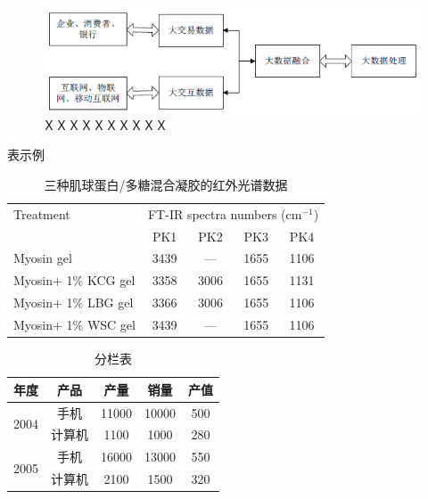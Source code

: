 \documentclass[a4paper]{ltxdoc}
\begin{document}
{\begin{figure}[!htb]
	\centering
	\includegraphics{images/example_figure2.png}
	\caption{ＸＸＸＸＸＸＸＸＸＸ}
\end{figure}

\clearpage
表示例
\begin{table}[!htb]
\centering
\caption{三种肌球蛋白/多糖混合凝胶的红外光谱数据}
\begin{tabular}{lcccc}
\hline
Treatment           & \multicolumn{4}{c}{FT-IR spectra numbers (cm$^{−1}$)} \\ \cline{2-5} 
                    & PK1        & PK2        & PK3        & PK4       \\ \hline
Myosin gel          & 3439       & —          & 1655       & 1106      \\
Myosin+ 1\% KCG gel & 3358       & 3006       & 1655       & 1131      \\
Myosin+ 1\% LBG gel & 3366       & 3006       & 1655       & 1106      \\
Myosin+ 1\% WSC gel & 3439       & —          & 1655       & 1106      \\ \hline
\end{tabular}
\end{table}

\begin{table}[!htb]
\centering
\caption{分栏表}
\begin{tabular}{ccccc}
\hline
年度                    & 产品  & 产量    & 销量    & 产值  \\ \hline
\multirow{2}{*}{2004} & 手机  & 11000 & 10000 & 500 \\
                      & 计算机 & 1100  & 1000  & 280 \\ \hline
\multirow{2}{*}{2005} & 手机  & 16000 & 13000 & 550 \\
                      & 计算机 & 2100  & 1500  & 320 \\ \hline
\end{tabular}
\end{table}
}

{
\clearpage %
\nocite{*} %
}
\end{document}
